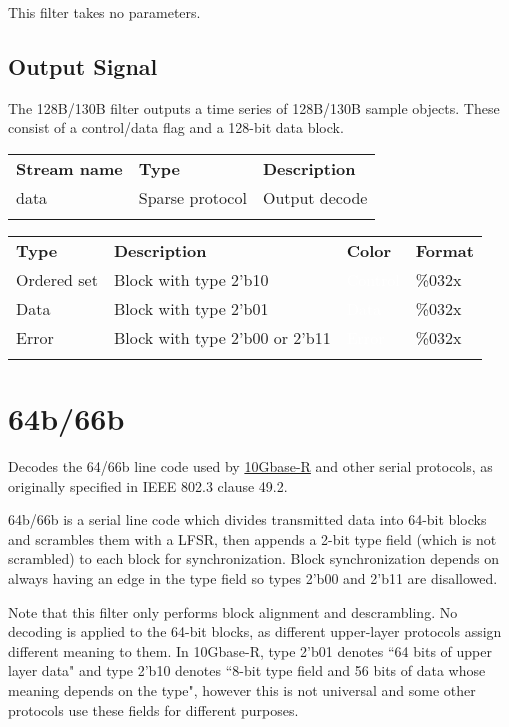 This filter takes no parameters.

\subsection{Output Signal}

The 128B/130B filter outputs a time series of 128B/130B sample objects. These consist of a control/data flag and
a 128-bit data block.

\begin{tabularx}{16cm}{llX}
\thickhline
\textbf{Stream name} & \textbf{Type} & \textbf{Description} \\
\thickhline
data & Sparse protocol & Output decode \\
\thickhline
\end{tabularx}

\begin{tabularx}{16cm}{lllX}
\thickhline
\textbf{Type} & \textbf{Description} & \textbf{Color} & \textbf{Format} \\
\thickhline
Ordered set & Block with type 2'b10 & \cellcolor{control}\textcolor{white}{Control} & \%032x \\
\thinhline
Data & Block with type 2'b01 & \cellcolor{data}\textcolor{white}{Data} & \%032x \\
\thinhline
Error & Block with type 2'b00 or 2'b11 & \cellcolor{error}\textcolor{white}{Error} & \%032x \\
\thickhline
\end{tabularx}

\pagebreak
\section{64b/66b}
\label{filter:64b66b}

Decodes the 64/66b line code used by \hyperref[filter:10gbaser]{10Gbase-R} and other serial protocols, as originally
specified in IEEE 802.3 clause 49.2.

64b/66b is a serial line code which divides transmitted data into 64-bit blocks and scrambles them with a LFSR, then
appends a 2-bit type field (which is not scrambled) to each block for synchronization. Block synchronization depends on
always having an edge in the type field so types 2'b00 and 2'b11 are disallowed.

Note that this filter only performs block alignment and descrambling. No decoding is applied to the 64-bit blocks, as
different upper-layer protocols assign different meaning to them. In 10Gbase-R, type 2'b01 denotes ``64 bits of upper
layer data" and type 2'b10 denotes ``8-bit type field and 56 bits of data whose meaning depends on the type", however
this is not universal and some other protocols use these fields for different purposes.

